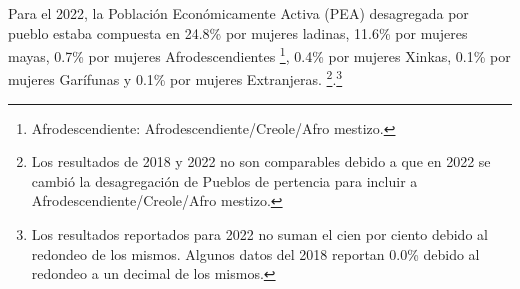 Para el 2022, la Población Económicamente Activa (PEA) desagregada por pueblo estaba compuesta en 24.8\% por mujeres ladinas, 11.6\% por mujeres mayas, 0.7\% por mujeres Afrodescendientes \footnote{Afrodescendiente: Afrodescendiente/Creole/Afro mestizo.}, 0.4\% por mujeres Xinkas, 0.1\% por mujeres Garífunas y 0.1\% por mujeres Extranjeras. \footnote{Los resultados de 2018 y 2022 no son comparables debido a que en 2022 se cambió la desagregación de Pueblos de pertencia para incluir a Afrodescendiente/Creole/Afro mestizo.}.\footnote{Los resultados reportados para 2022 no suman el cien por ciento debido al redondeo de los mismos. Algunos datos del 2018 reportan 0.0\% debido al redondeo a un decimal de los mismos.}
